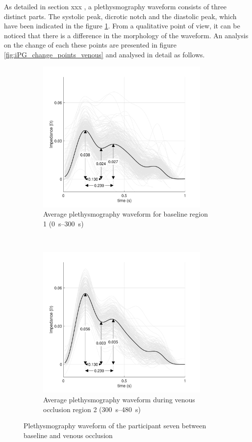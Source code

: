 As detailed in section xxx , a plethysmography waveform consists of three distinct parts. The systolic peak, dicrotic notch and the diastolic peak, which have been indicated in the figure \ref{fig:iPG_venous_baseline}. From a qualitative point of view, it can be noticed that there is a difference in the morphology of the waveform. An analysis on the change of each these points are presented in figure \ref{fig:iPG_change_points_venous} and analysed in detail as follows.

\begin{figure}[h]
	\centering
	\begin{subfigure}[t]{0.5\textwidth}
		\centering
		\includegraphics[height=7.6cm]{figure6a}
		\caption{Average plethysmography waveform for baseline region 1 (\SIrange{0}{300}{\second})}
		\label{fig:iPG_venous_baseline}
	\end{subfigure}%
	~ 
	\begin{subfigure}[t]{0.5\textwidth}
		\centering
		\includegraphics[height=7.6cm]{figure6b}
		\caption{Average plethysmography waveform during venous occlusion region 2 (\SIrange{300}{480}{\second})}
		\label{fig:iPG_venous_occlusion}
	\end{subfigure}
	\caption{Plethysmography waveform of the participant seven between baseline and venous occlusion}
	\label{fig:iPG_venous}
\end{figure}


